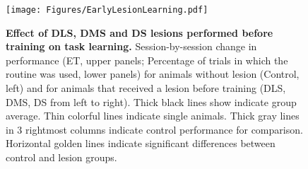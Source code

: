\begin{figure}[h!]
  \begin{center}
	\texttt{[image: Figures/EarlyLesionLearning.pdf]}
	\caption
	{\textbf{Effect of DLS, DMS and DS lesions performed before training on task learning.}
	Session-by-session change in performance (ET, upper panels; Percentage of trials in which the routine was used, lower panels) for animals without lesion (Control, left) and for animals that received a lesion before training (DLS, DMS, DS from left to right). 
	Thick black lines show indicate group average.
    Thin colorful lines indicate single animals.
    Thick gray lines in 3 rightmost columns indicate control performance for comparison.
    Horizontal golden lines indicate significant differences between control and lesion groups. 
	}
	\label{sfig7}
  \end{center}
\end{figure}
